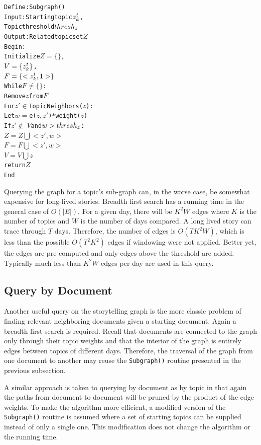 \documentclass[10pt]{article}
\begin{document}
\begin{framed}
\begin{center}
\begin{alltt}
Define: Subgraph()
Input:  Starting topic \(z\sb{k}\sp{t}\), 
        Topic threshold \(thresh\sb{z}\)
Output: Related topic set \(Z\)
Begin:
  Initialize \(Z = \{\}\),             
             \(V = \{z\sb{k}\sp{t}\}\),
             \(F = \{<z\sb{k}\sp{t}, 1>\}\)
  While \(F \ne \{\}\):
     Remove \(z\) from \(F\)
     For \(z' \in\) TopicNeighbors(\(z\)):
       Let \(w = \)e(\(z, z'\))*weight(\(z\))
       If \(z' \not\in\ V\) and \(w >thresh\sb{z}\):
         \(Z = Z \bigcup <z', w>\)
         \(F = F \bigcup <z', w> \)
     \(V = V \bigcup z\)
  return \(Z\)
End
\end{alltt}
\end{center}
\end{framed}

Querying the graph for a topic's sub-graph can, in the worse case, be somewhat expensive for long-lived stories.  Breadth first search has a running time in the general case of $O(|E|)$.  For a given day, there will be $K^2W$ edges where $K$ is the number of topics and $W$ is the number of days compared.  A long lived story can trace through $T$ days.  Therefore, the number of edges is $O(TK^2W)$, which is less than the possible $O(T^2K^2)$ edges if windowing were not applied.  Better yet, the edges are pre-computed and only edges above the threshold are added. Typically much less than $K^2W$ edges per day are used in this query.

\subsection {Query by Document}
Another useful query on the storytelling graph is the more classic problem of finding relevant neighboring documents given a starting document.  Again a breadth first search is required.  Recall that documents are connected to the graph only through their topic weights and that the interior of the graph is entirely edges between topics of different days.  Therefore, the traversal of the graph from one document to another may reuse the \texttt{Subgraph()} routine presented in the previous subsection.

A similar approach is taken to querying by document as by topic in that again the paths from document to document will be pruned by the product of the edge weights. To make the algorithm more efficient, a modified version of the \texttt{Subgraph()} routine is assumed where a set of starting topics can be supplied instead of only a single one.  This modification does not change the algorithm or the running time.
\end{document}
